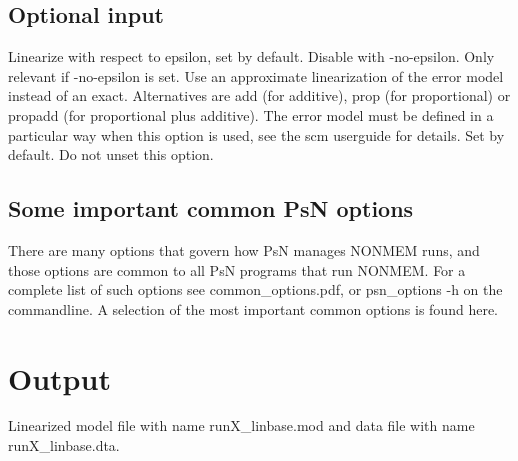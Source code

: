 \subsection{Optional input}
\begin{optionlist}
Linearize with respect to epsilon, set by default. Disable with -no-epsilon.
\nextopt
{}
Only relevant if -no-epsilon is set. 
Use an approximate linearization of the error model instead of an exact.
Alternatives are add (for additive), prop (for proportional) or
propadd (for proportional plus additive).
The error model must be defined in a particular way when this option is used,
see the scm userguide for details.
\nextopt
{}
Set by default. Do not unset this option.
\nextopt
\end{optionlist}

\subsection{Some important common PsN options}
There are many options that govern how PsN manages NONMEM runs, and
those options are common to all PsN programs that run NONMEM.
For a complete list of such options see common\_options.pdf, 
or psn\_options -h on the commandline. A selection of
the most important common options is found here.



\section{Output}
Linearized model file with name runX\_linbase.mod and data file with name runX\_linbase.dta.



